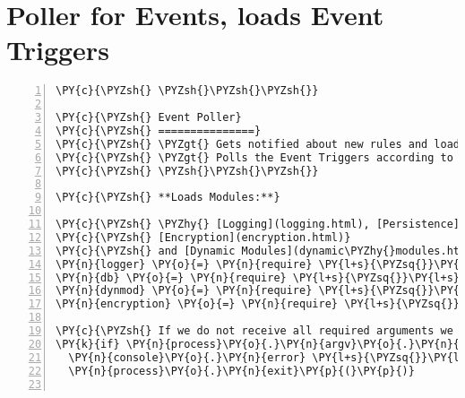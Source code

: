 
















\clearpage
\section{Poller for Events, loads Event Triggers}
\begin{Verbatim}[fontsize=\scriptsize,commandchars=\\\{\},numbers=left,firstnumber=1,stepnumber=1]
\PY{c}{\PYZsh{} \PYZsh{}\PYZsh{}\PYZsh{}}

\PY{c}{\PYZsh{} Event Poller}
\PY{c}{\PYZsh{} ===============}
\PY{c}{\PYZsh{} \PYZgt{} Gets notified about new rules and loads event poller (trigger) if it is part of the rule.}
\PY{c}{\PYZsh{} \PYZgt{} Polls the Event Triggers according to their predefined intervals and starting times.}
\PY{c}{\PYZsh{} \PYZsh{}\PYZsh{}\PYZsh{}}

\PY{c}{\PYZsh{} **Loads Modules:**}

\PY{c}{\PYZsh{} \PYZhy{} [Logging](logging.html), [Persistence](persistence.html),}
\PY{c}{\PYZsh{} [Encryption](encryption.html)}
\PY{c}{\PYZsh{} and [Dynamic Modules](dynamic\PYZhy{}modules.html)}
\PY{n}{logger} \PY{o}{=} \PY{n}{require} \PY{l+s}{\PYZsq{}}\PY{l+s}{./logging}\PY{l+s}{\PYZsq{}}
\PY{n}{db} \PY{o}{=} \PY{n}{require} \PY{l+s}{\PYZsq{}}\PY{l+s}{./persistence}\PY{l+s}{\PYZsq{}}
\PY{n}{dynmod} \PY{o}{=} \PY{n}{require} \PY{l+s}{\PYZsq{}}\PY{l+s}{./dynamic\PYZhy{}modules}\PY{l+s}{\PYZsq{}}
\PY{n}{encryption} \PY{o}{=} \PY{n}{require} \PY{l+s}{\PYZsq{}}\PY{l+s}{./encryption}\PY{l+s}{\PYZsq{}}

\PY{c}{\PYZsh{} If we do not receive all required arguments we shut down immediately}
\PY{k}{if} \PY{n}{process}\PY{o}{.}\PY{n}{argv}\PY{o}{.}\PY{n}{length} \PY{o}{\PYZlt{}} \PY{l+m+mi}{8}
  \PY{n}{console}\PY{o}{.}\PY{n}{error} \PY{l+s}{\PYZsq{}}\PY{l+s}{Not all arguments have been passed!}\PY{l+s}{\PYZsq{}}
  \PY{n}{process}\PY{o}{.}\PY{n}{exit}\PY{p}{(}\PY{p}{)}


\end{Verbatim}
